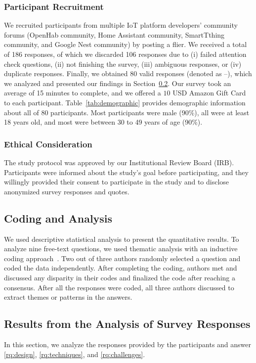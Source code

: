 \subsubsection{Participant Recruitment}
We recruited participants from multiple IoT platform developers' community forums (\eg OpenHab community, Home Assistant community, SmartTthing community, and Google Nest community) by posting a flier. 
We received a total of 186 responses, of which we discarded 106 responses
due to (i) failed attention check questions, (ii) not finishing the survey, (iii) ambiguous responses, or (iv) duplicate responses. Finally, we obtained 80 valid responses (denoted as --), which we analyzed and presented our findings in Section~\ref{survey-results}. Our survey took an average of 15 minutes to complete, and we offered a $10$ USD Amazon Gift Card to each participant. Table~\ref{tab:demographic} provides demographic information about all of 80
participants. 
Most participants were male (90\%), all were at least 18 years old, and most were between 30 to 49 years of age (90\%).

\subsubsection{Ethical Consideration}
The study protocol was approved by our Institutional Review Board (IRB). 
Participants were informed about the study's goal before participating, and they willingly provided their consent to participate in the study and to disclose anonymized survey responses and quotes. 


\subsection{Coding and Analysis}
We used descriptive statistical analysis to present the quantitative results. 
To analyze nine free-text questions, we used thematic analysis with an inductive coding approach~\cite{braun2021thematic}. 
Two out of three authors randomly selected a question and coded the data independently. 
After completing the coding, authors met and discussed any disparity in their codes and finalized the code after reaching a consensus. 
After all the responses were coded, all three authors discussed to extract themes or patterns in the answers. %










\subsection{Results from the Analysis of Survey Responses}
\label{survey-results}
In this section, we analyze the responses provided by the participants and answer 
\ref{rq:design}, \ref{rq:techniques}, and \ref{rq:challenges}.

